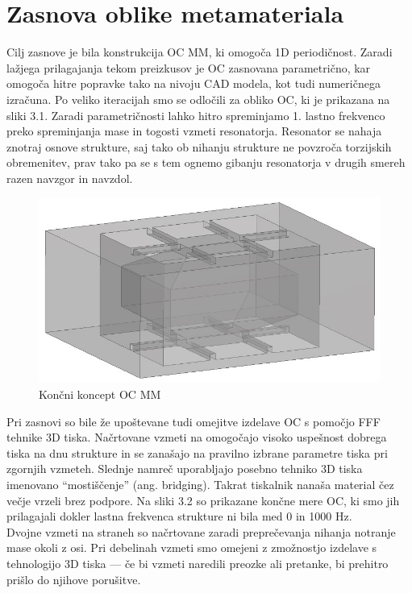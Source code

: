 \documentclass[12pt]{report}
\begin{document}
\section{Zasnova oblike metamateriala}
Cilj zasnove je bila konstrukcija \ac{OC} \ac{MM}, ki omogoča 1D periodičnost. Zaradi lažjega prilagajanja tekom preizkusov je \ac{OC} zasnovana parametrično, kar omogoča hitre popravke
tako na nivoju CAD modela, kot tudi numeričnega izračuna. Po veliko iteracijah smo se odločili za obliko \ac{OC}, ki je prikazana na sliki 3.1. Zaradi parametričnosti lahko hitro spreminjamo 1. lastno frekvenco preko 
spreminjanja mase in togosti vzmeti resonatorja. Resonator se nahaja znotraj osnove strukture, saj tako ob nihanju strukture ne povzroča torzijskih obremenitev, prav tako pa se s tem
ognemo gibanju resonatorja v drugih smereh razen navzgor in navzdol.
\begin{figure}[H]
  \centering
  \includegraphics[scale=0.6]{Images/BaseCell_v4.JPG}
  \caption{Končni koncept \ac{OC} \ac{MM}}
\end{figure}
\noindent Pri zasnovi so bile že upoštevane tudi omejitve izdelave \ac{OC} s pomočjo FFF tehnike 3D tiska. Načrtovane vzmeti na omogočajo visoko uspešnost dobrega tiska
na dnu strukture in se zanašajo na pravilno izbrane parametre tiska pri zgornjih vzmeteh. Slednje namreč uporabljajo posebno tehniko 3D tiska imenovano ``mostiščenje'' (ang. bridging). Takrat tiskalnik nanaša material čez
večje vrzeli brez podpore. Na sliki 3.2 so prikazane končne mere \ac{OC}, ki smo jih prilagajali dokler lastna frekvenca strukture ni bila med 0 in 1000 Hz.
\\
Dvojne vzmeti na straneh so načrtovane zaradi preprečevanja nihanja notranje mase okoli z osi. Pri debelinah vzmeti smo omejeni z zmožnostjo izdelave s tehnologijo 3D tiska --- če bi
vzmeti naredili preozke ali pretanke, bi prehitro prišlo do njihove porušitve.
\end{document}
